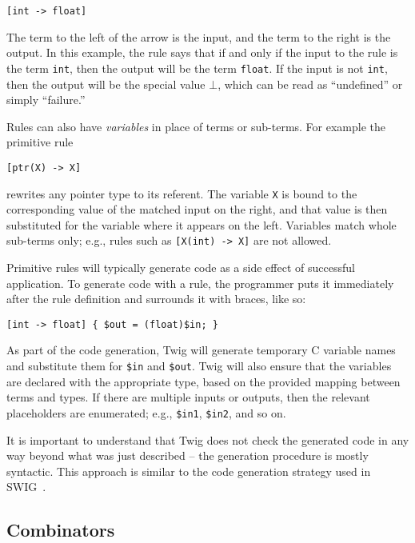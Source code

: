 \begin{verbatim}
[int -> float]
\end{verbatim}

The term to the left of the arrow is the input, and the term to the right is the
output. In this example, the rule says that if and only if the input to the rule
is the term \texttt{int}, then the output will be the term \texttt{float}. If
the input is not \texttt{int}, then the output will be the special value $\bot$,
which can be read as ``undefined'' or simply ``failure.''

Rules can also have \emph{variables} in place of terms or sub-terms. For
example the primitive rule

\begin{verbatim}
[ptr(X) -> X]
\end{verbatim}

rewrites any pointer type to its referent. The variable \texttt{X} is bound to
the corresponding value of the matched input on the right, and that value is
then substituted for the variable where it appears on the left. Variables match
whole sub-terms only; e.g., rules such as \texttt{[X(int) -> X]} are not
allowed.

Primitive rules will typically generate code as a side effect of successful
application. To generate code with a rule, the programmer puts it immediately
after the rule definition and surrounds it with braces, like so:

\begin{verbatim}
[int -> float] { $out = (float)$in; }
\end{verbatim}

As part of the code generation, Twig will generate temporary C variable names
and substitute them for \texttt{\$in} and \texttt{\$out}. Twig will also ensure
that the variables are declared with the appropriate type, based on the provided
mapping between terms and types. If there are multiple inputs or outputs, then
the relevant placeholders are enumerated; e.g., \texttt{\$in1}, \texttt{\$in2},
and so on.

It is important to understand that Twig does not check the generated code in any
way beyond what was just described -- the generation procedure is mostly
syntactic. This approach is similar to the code generation strategy used in
SWIG~\cite{swig}.

\subsection{Combinators}


